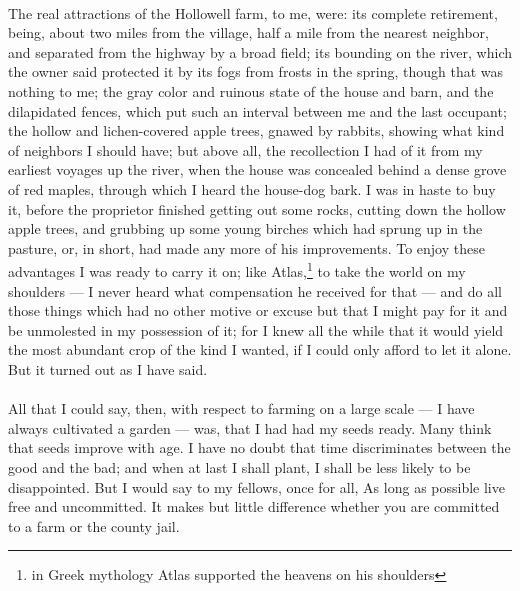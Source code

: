 \documentclass[letterpaper,12pt]{article}
\begin{document}
\paragraph{} The real attractions of the Hollowell farm, to me, were: its
complete retirement, being, about two miles from the village, half a mile from
the nearest neighbor, and separated from the highway by a broad field; its
bounding on the river, which the owner said protected it by its fogs from frosts
in the spring, though that was nothing to me; the gray color and ruinous state
of the house and barn, and the dilapidated fences, which put such an interval
between me and the last occupant; the hollow and lichen-covered apple trees,
gnawed by rabbits, showing what kind of neighbors I should have; but above all,
the recollection I had of it from my earliest voyages up the river, when the
house was concealed behind a dense grove of red maples, through which I heard
the house-dog bark. I was in haste to buy it, before the proprietor finished
getting out some rocks, cutting down the hollow apple trees, and grubbing up
some young birches which had sprung up in the pasture, or, in short, had made
any more of his improvements. To enjoy these advantages I was ready to carry it
on; like Atlas,\footnote{in Greek mythology Atlas supported the heavens on his
    shoulders} to take the world on my shoulders --- I never heard what
compensation he received for that --- and do all those things which had no other
motive or excuse but that I might pay for it and be unmolested in my possession
of it; for I knew all the while that it would yield the most abundant crop of
the kind I wanted, if I could only afford to let it alone. But it turned out as
I have said.

\paragraph{} All that I could say, then, with respect to farming on a large
scale --- I have always cultivated a garden --- was, that I had had my seeds
ready. Many think that seeds improve with age. I have no doubt that time
discriminates between the good and the bad; and when at last I shall plant,
I shall be less likely to be disappointed. But I would say to my fellows, once
for all, As long as possible live free and uncommitted. It makes but little
difference whether you are committed to a farm or the county jail.
\end{document}
